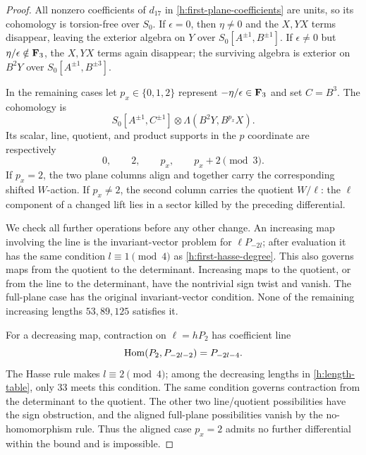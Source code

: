 \begin{proof}
All nonzero coefficients of $d_{17}$ in
\eqref{h:first-plane-coefficients} are units, so its cohomology is
torsion-free over $S_0$. If $\epsilon=0$, then $\eta\ne0$ and the
$X,YX$ terms disappear, leaving the exterior algebra on $Y$ over
$S_0[A^{\pm1},B^{\pm1}]$. If $\epsilon\ne0$ but
$\eta/\epsilon\notin\mathbf F_3$, the $X,YX$ terms again disappear;
the surviving algebra is exterior on $B^2Y$ over
$S_0[A^{\pm1},B^{\pm3}]$.

In the remaining cases let $p_x\in\{0,1,2\}$ represent
$-\eta/\epsilon\in\mathbf F_3$ and set
$C=B^3$. The cohomology is
\begin{equation}
 \label{h:e18-algebra}
 S_0[A^{\pm1},C^{\pm1}]
   \otimes\Lambda(B^2Y,B^{p_x}X).
\end{equation}
Its scalar, line, quotient, and product supports in the $p$ coordinate
are respectively
\begin{equation}
 \label{h:e18-support}
 0,\qquad2,\qquad p_x,\qquad p_x+2\pmod3.
\end{equation}
If $p_x=2$, the two plane columns align and together carry the
corresponding shifted $W$-action. If $p_x\ne2$, the second column
carries the quotient $W/\ell$: the $\ell$ component of a changed
lift lies in a sector killed by the preceding differential.

We check all further operations before any other change. An increasing
map involving the line is the invariant-vector problem for
$\ell P_{-2l}$; after evaluation it has the same condition
$l\equiv1\pmod4$ as \eqref{h:first-hasse-degree}. This also governs
maps from the quotient to the determinant. Increasing maps to the
quotient, or from the line to the determinant, have the nontrivial
sign twist and vanish. The full-plane case has the original
invariant-vector condition. None of the remaining increasing lengths
$53,89,125$ satisfies it.

For a decreasing map, contraction on $\ell=hP_2$ has coefficient
line
\begin{equation}
 \label{h:line-contraction}
 \operatorname{Hom}(P_2,P_{-2l-2})=P_{-2l-4}.
\end{equation}
The Hasse rule makes $l\equiv2\pmod4$; among the decreasing lengths
in \eqref{h:length-table}, only $33$ meets this condition. The same
condition governs contraction from the determinant to the quotient.
The other two line/quotient possibilities have the sign obstruction,
and the aligned full-plane possibilities vanish by the no-homomorphism
rule. Thus the aligned case $p_x=2$ admits no further differential
within the bound and is impossible.


\end{proof}
